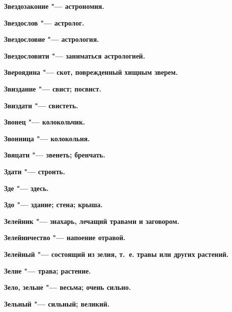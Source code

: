 \begin{multicols}{2}
\bfseries Звездозаконие\normalfont{} "--- астрономия. 




\bfseries Звездослов\normalfont{} "--- астролог. 




\bfseries Звездословие\normalfont{} "--- астрология. 




\bfseries Звездословити\normalfont{} "--- заниматься астрологией. 




\bfseries Звероядина\normalfont{} "--- скот, поврежденный хищным зверем. 




\bfseries Звиздание\normalfont{} "--- свист; посвист. 




\bfseries Звиздати\normalfont{} "--- свистеть. 




\bfseries Звонец\normalfont{} "--- колокольчик. 




\bfseries Звонница\normalfont{} "--- колокольня. 




\bfseries Звяцати\normalfont{} "--- звенеть; бренчать. 




\bfseries Здати\normalfont{} "--- строить. 




\bfseries Зде\normalfont{} "--- здесь. 




\bfseries Здо\normalfont{} "--- здание; стена; крыша. 




\bfseries Зелейник\normalfont{} "--- знахарь, лечащий травами и заговором. 




\bfseries Зелейничество\normalfont{} "--- напоение отравой. 




\bfseries Зелейный\normalfont{} "--- состоящий из зелия, т.~е. травы или других растений. 




\bfseries Зелие\normalfont{} "--- трава; растение. 




\bfseries Зело, зельне\normalfont{} "--- весьма; очень сильно. 




\bfseries Зельный\normalfont{} "--- сильный; великий. 





\end{multicols}
